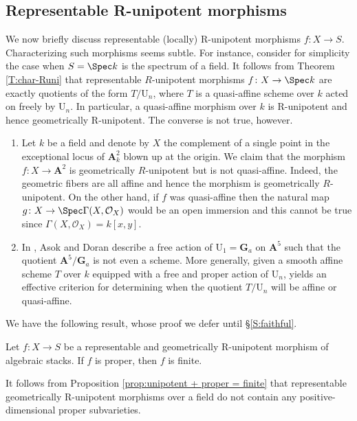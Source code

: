 \documentclass[reqno,a4paper]{amsart}
\numberwithin{Theorem}{section}
\renewcommand{\U}{\mathrm{U}}
\theoremstyle{plain}
\theoremstyle{remark}
\newcommand{\spref}[1]{\href{https://stacks.math.columbia.edu/tag/#1}{#1}}
\begin{document}
\subsection{Representable R-unipotent morphisms} We now briefly discuss representable (locally) R-unipotent morphisms
$f\colon X\to S$. Characterizing such morphisms seems subtle. For
instance, consider for simplicity the case when $S=\Spec k$ is the
spectrum of a field. It follows from Theorem \ref{T:char-Runi} that
representable $R$-unipotent morphisms $f\colon X\to \Spec k$ are
exactly quotients of the form $T/\U_{n}$, where $T$ is a quasi-affine
scheme over $k$ acted on freely by $\U_{n}$. In particular, a
quasi-affine morphism over $k$ is R-unipotent and hence geometrically
R-unipotent. The converse is not true, however.
\begin{Example} \label{ex:repunipotent} 
{\par\noindent}
\begin{enumerate}
\item Let $k$ be a field and denote by $X$ the complement of a single
  point in the exceptional locus of $\mathbf{A}^2_k$ blown up at the
  origin. We claim that the morphism $f\colon X \to \mathbf{A}^2$ is
  geometrically $R$-unipotent but is not quasi-affine. Indeed, the
  geometric fibers are all affine and hence the morphism is
  geometrically $R$-unipotent. On the other hand, if $f$ was
  quasi-affine then the natural map
  $g\colon X \to \Spec \Gamma(X,\mathcal{O}_X)$ would be an open immersion
   \cite[Tag \spref{01SM}]{stacks-project} and this cannot be true
  since $\Gamma(X,\mathcal{O}_X)=k[x,y]$.
\item In \cite[Ex. 3.16]{MR2335246}, Asok and Doran describe a free action
  of $\U_1=\mathbf{G}_a$ on $\mathbf{A}^5$ such that the quotient
  $\mathbf{A}^5/\mathbf{G}_a$ is not even a scheme. More generally,
  given a smooth affine scheme $T$ over $k$ equipped with a free and proper action of $\U_n$,
  \cite[Corollary 3.18]{MR2335246} yields an effective
  criterion for determining when the quotient $T/\U_n$ will be affine
  or quasi-affine.
\end{enumerate}
\end{Example}
We have the following result, whose proof we defer until \S\ref{S:faithful}.
\begin{proposition}\label{prop:unipotent + proper = finite}
  Let $f\colon X\to S$ be a representable and geometrically R-unipotent
  morphism of algebraic stacks. If $f$ is proper, then $f$ is finite.
\end{proposition}
It follows from Proposition \ref{prop:unipotent + proper = finite}
that representable geometrically R-unipotent morphisms over a field do not contain
any positive-dimensional proper subvarieties.
\end{document}
